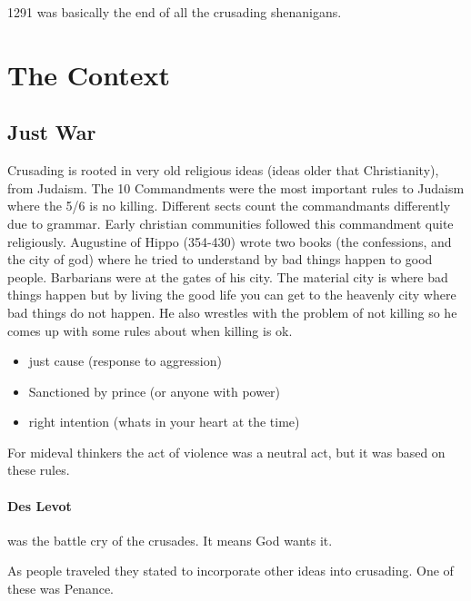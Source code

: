 \documentclass{article}
\begin{document}
1291 was basically the end of all the crusading shenanigans.

\section*{The Context}
\label{sec:the_context}

\subsection*{Just War}
\label{sub:just_war}
Crusading is rooted in very old religious ideas (ideas older that Christianity), from Judaism. The 10 Commandments were the most important rules to Judaism where the 5/6 is no killing. Different sects count the commandmants differently due to grammar. Early christian communities followed this commandment quite religiously. Augustine of Hippo (354-430) wrote two books (the confessions, and the city of god) where he tried to understand by bad things happen to good people. Barbarians were at the gates of his city. The material city is where bad things happen but by living the good life you can get to the heavenly city where bad things do not happen. He also wrestles with the problem of not killing so he comes up with some rules about when killing is ok.
\begin{itemize}
	\item just cause (response to aggression)
	\item Sanctioned by prince (or anyone with power)
	\item right intention (whats in your heart at the time)
\end{itemize}

For mideval thinkers the act of violence was a neutral act, but it was based on these rules.

\paragraph{Des Levot}
\label{par:des_levot}
was the battle cry of the crusades. It means God wants it.

As people traveled they stated to incorporate other ideas into crusading. One of these was Penance.
\end{document}
